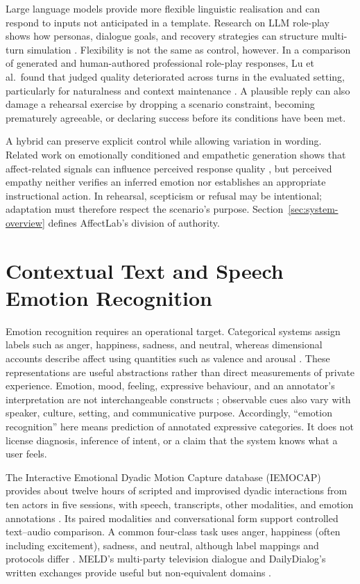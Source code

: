 Large language models provide more flexible linguistic realisation and can respond to inputs not anticipated in a template. Research on LLM role-play shows how personas, dialogue goals, and recovery strategies can structure multi-turn simulation \cite{tamoyan2025roleplay}. Flexibility is not the same as control, however. In a comparison of generated and human-authored professional role-play responses, Lu et al.\ found that judged quality deteriorated across turns in the evaluated setting, particularly for naturalness and context maintenance \cite{lu2025roleplay}. A plausible reply can also damage a rehearsal exercise by dropping a scenario constraint, becoming prematurely agreeable, or declaring success before its conditions have been met.

A hybrid can preserve explicit control while allowing variation in wording. Related work on emotionally conditioned and empathetic generation shows that affect-related signals can influence perceived response quality \cite{zhou2018ecm,rashkin2019empathetic}, but perceived empathy neither verifies an inferred emotion nor establishes an appropriate instructional action. In rehearsal, scepticism or refusal may be intentional; adaptation must therefore respect the scenario's purpose. Section~\ref{sec:system-overview} defines AffectLab's division of authority.

\section{Contextual Text and Speech Emotion Recognition}
\label{sec:sota-affect-theory}
\label{sec:sota-datasets}
\label{sec:sota-text}
\label{sec:sota-speech}

Emotion recognition requires an operational target. Categorical systems assign labels such as anger, happiness, sadness, and neutral, whereas dimensional accounts describe affect using quantities such as valence and arousal \cite{ekman1992basic,russell1980circumplex}. These representations are useful abstractions rather than direct measurements of private experience. Emotion, mood, feeling, expressive behaviour, and an annotator's interpretation are not interchangeable constructs \cite{scherer2005emotions}; observable cues also vary with speaker, culture, setting, and communicative purpose. Accordingly, ``emotion recognition'' here means prediction of annotated expressive categories. It does not license diagnosis, inference of intent, or a claim that the system knows what a user feels.

The Interactive Emotional Dyadic Motion Capture database (IEMOCAP) provides about twelve hours of scripted and improvised dyadic interactions from ten actors in five sessions, with speech, transcripts, other modalities, and emotion annotations \cite{busso2008iemocap}. Its paired modalities and conversational form support controlled text--audio comparison. A common four-class task uses anger, happiness (often including excitement), sadness, and neutral, although label mappings and protocols differ \cite{li2022contextaware}. MELD's multi-party television dialogue and DailyDialog's written exchanges provide useful but non-equivalent domains \cite{poria2019meld,li2017dailydialog}.

